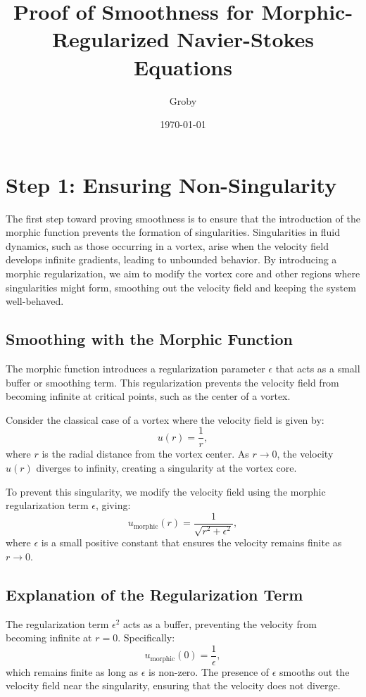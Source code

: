 \documentclass{article}
\title{Proof of Smoothness for Morphic-Regularized Navier-Stokes Equations}
\author{Groby}
\date{\today}
\begin{document}
\maketitle

\section*{Step 1: Ensuring Non-Singularity}

The first step toward proving smoothness is to ensure that the introduction of the morphic function prevents the formation of singularities. Singularities in fluid dynamics, such as those occurring in a vortex, arise when the velocity field develops infinite gradients, leading to unbounded behavior. By introducing a morphic regularization, we aim to modify the vortex core and other regions where singularities might form, smoothing out the velocity field and keeping the system well-behaved.

\subsection*{Smoothing with the Morphic Function}

The morphic function introduces a regularization parameter \( \epsilon \) that acts as a small buffer or smoothing term. This regularization prevents the velocity field from becoming infinite at critical points, such as the center of a vortex.

Consider the classical case of a vortex where the velocity field is given by:
\[
u(r) = \frac{1}{r},
\]
where \( r \) is the radial distance from the vortex center. As \( r \to 0 \), the velocity \( u(r) \) diverges to infinity, creating a singularity at the vortex core.

To prevent this singularity, we modify the velocity field using the morphic regularization term \( \epsilon \), giving:
\[
u_{\text{morphic}}(r) = \frac{1}{\sqrt{r^2 + \epsilon^2}},
\]
where \( \epsilon \) is a small positive constant that ensures the velocity remains finite as \( r \to 0 \).

\subsection*{Explanation of the Regularization Term}

The regularization term \( \epsilon^2 \) acts as a buffer, preventing the velocity from becoming infinite at \( r = 0 \). Specifically:
\[
u_{\text{morphic}}(0) = \frac{1}{\epsilon},
\]
which remains finite as long as \( \epsilon \) is non-zero. The presence of \( \epsilon \) smooths out the velocity field near the singularity, ensuring that the velocity does not diverge.
\end{document}
